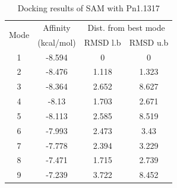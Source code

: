 \documentclass[12pt]{article}
\begin{document}
	\begin{table}[h!]
		\centering
		\caption{\centering Docking results of SAM with Pn1.1317}
		\label{table4_1}
		\begin{tabular}{cccc}
			\toprule
			\multirow{2}{*}{Mode} & Affinity & \multicolumn{2}{c}{Dist. from best mode}\\
			&  (kcal/mol) & RMSD l.b & RMSD u.b\\
			\midrule
			1 & -8.594   &       0   &       0\\
			2 & -8.476   &   1.118   &   1.323\\
			3 & -8.364   &   2.652   &   8.627\\
			4 &  -8.13   &   1.703   &   2.671\\
			5 & -8.113   &   2.585   &   8.519\\
			6 & -7.993   &   2.473   &    3.43\\
			7 & -7.778   &   2.394   &   3.229\\
			8 & -7.471   &   1.715   &   2.739\\
			9 & -7.239   &   3.722   &   8.452\\
			\bottomrule
			
		\end{tabular}
	\end{table}
	
\end{document}
